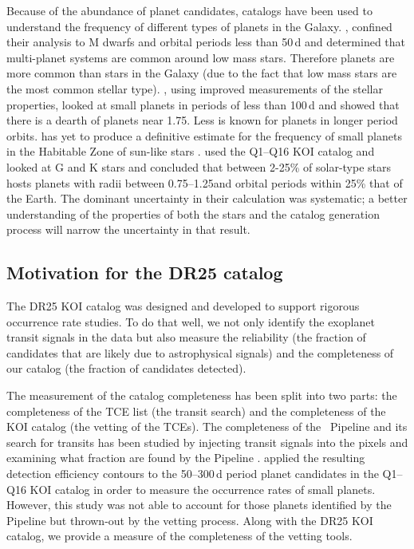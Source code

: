 Because of the abundance of planet candidates, \Kepler{} catalogs have been used to understand the frequency of different types of planets in the Galaxy. \citet{Dressing2013,Dressing2015}, confined their analysis to M dwarfs and orbital periods less than 50\,d and determined that multi-planet systems are common around low mass stars.  Therefore planets are more common than stars in the Galaxy (due to the fact that low mass stars are the most common stellar type). \citet{Fulton2017}, using improved measurements of the stellar properties, looked at small planets in periods of less than 100\,d and showed that there is a dearth of planets near 1.75\re. Less is known for planets in longer period orbits. \Kepler{} has yet to produce a definitive estimate for the frequency of small planets in the Habitable Zone of sun-like stars \citep[see e.g.][]{ForemanMackey16, Petigura2013b, Burke2015}. \citet{Burke2015} used the Q1--Q16 \citep{Mullally2015cat} KOI catalog and looked at G and K stars and concluded that between 2-25\% of solar-type stars hosts planets with radii between 0.75--1.25\re and orbital periods within 25\% that of the Earth. The dominant uncertainty in their calculation was systematic; a better understanding of the properties of both the stars and the catalog generation process will narrow the uncertainty in that result. 

 

\subsection{Motivation for the DR25 catalog}

The DR25 KOI catalog was designed and developed to support rigorous occurrence rate studies. To do that well, we not only identify the exoplanet transit signals in the data but also measure the reliability (the fraction of candidates that are likely due to astrophysical signals) and the completeness of our catalog (the fraction of candidates detected).

The measurement of the catalog completeness has been split into two parts: the completeness of the TCE list (the transit search) and the completeness of the KOI catalog (the vetting of the TCEs). The completeness of the \Kepler\ Pipeline and its search for transits has been studied by injecting transit signals into the pixels and examining what fraction are found by the Pipeline \citep{Christiansen2017, Christiansen2015b,Christiansen2013a}. \citet{Burke2015} applied the resulting detection efficiency contours to the 50--300\,d period planet candidates in the Q1--Q16 KOI catalog \citep{Mullally2015cat} in order to measure the occurrence rates of small planets. However, this study was not able to account for those planets identified by the \Kepler{} Pipeline but thrown-out by the vetting process. Along with the DR25 KOI catalog, we provide a measure of the completeness of the vetting tools. 

